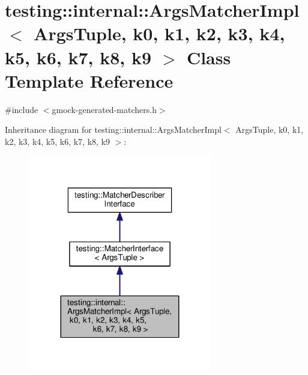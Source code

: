 \hypertarget{classtesting_1_1internal_1_1ArgsMatcherImpl}{}\section{testing\+:\+:internal\+:\+:Args\+Matcher\+Impl$<$ Args\+Tuple, k0, k1, k2, k3, k4, k5, k6, k7, k8, k9 $>$ Class Template Reference}
\label{classtesting_1_1internal_1_1ArgsMatcherImpl}


{\ttfamily \#include $<$gmock-\/generated-\/matchers.\+h$>$}



Inheritance diagram for testing\+:\+:internal\+:\+:Args\+Matcher\+Impl$<$ Args\+Tuple, k0, k1, k2, k3, k4, k5, k6, k7, k8, k9 $>$\+:
\nopagebreak
\begin{figure}[H]
\begin{center}
\leavevmode
\includegraphics[width=227pt]{classtesting_1_1internal_1_1ArgsMatcherImpl__inherit__graph}
\end{center}
\end{figure}


